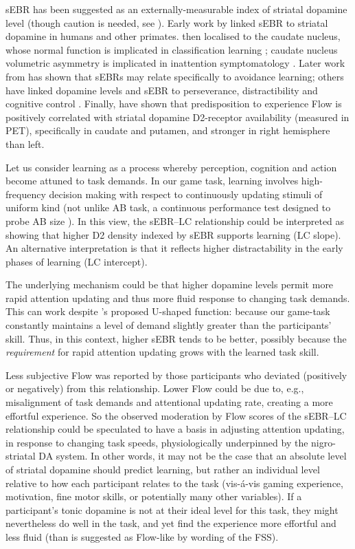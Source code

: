 \documentclass[a4paper,doc,floatsintext,natbib,10pt]{apa6}
\begin{document}
sEBR has been suggested as an externally-measurable index of striatal dopamine level (though caution is needed, see \cite{dang2017spontaneous}). Early work by \cite{Karson1983} linked sEBR to striatal dopamine in humans and other primates. \cite{Taylor1999} then localised to the caudate nucleus, whose normal function is implicated in classification learning \citep{Seger2005}; caudate nucleus volumetric asymmetry is implicated in inattention symptomatology \citep{Schrimsher2002}. Later work from \cite{Slagter2015} has shown that sEBRs may relate specifically to avoidance learning; others have linked dopamine levels and sEBR to perseverance, distractibility and cognitive control \citep{Muller2007,Dreisbach2005}. Finally, \cite{DeManzano2013} have shown that  predisposition to experience Flow is positively correlated with striatal dopamine D2-receptor availability (measured in PET), specifically in caudate and putamen, and stronger in right hemisphere than left.

Let us consider learning as a process whereby perception, cognition and action become attuned to task demands. In our game task, learning involves high-frequency decision making with respect to continuously updating stimuli of uniform kind (not unlike AB task, a continuous performance test designed to probe AB size \citep{Slagter2012}). In this view, the sEBR--LC relationship could be interpreted as showing that higher D2 density indexed by sEBR supports learning (LC slope). An alternative interpretation is that it reflects higher distractability in the early phases of learning (LC intercept).

The underlying mechanism could be that higher dopamine levels permit more rapid attention updating and thus more fluid response to changing task demands. This can work despite \cite{Slagter2012}'s proposed U-shaped function: because our game-task constantly maintains a level of demand slightly greater than the participants' skill. Thus, in this context, higher sEBR tends to be better, possibly because the {\it requirement} for rapid attention updating grows with the learned task skill.

Less subjective Flow was reported by those participants who deviated (positively or negatively) from this relationship. Lower Flow could be due to, e.g., misalignment of task demands and attentional updating rate, creating a more effortful experience. So the observed moderation by Flow scores of the sEBR--LC relationship could be speculated to have a basis in adjusting attention updating, in response to changing task speeds, physiologically underpinned by the nigro-striatal DA system. In other words, it may not be the case that an absolute level of striatal dopamine should predict learning, but rather an individual level relative to how each participant relates to the task (vis-\'{a}-vis gaming experience, motivation, fine motor skills, or potentially many other variables). If a participant's tonic dopamine is not at their ideal level for this task, they might nevertheless do well in the task, and yet find the experience more effortful and less fluid (than is suggested as Flow-like by wording of the FSS).
\end{document}
